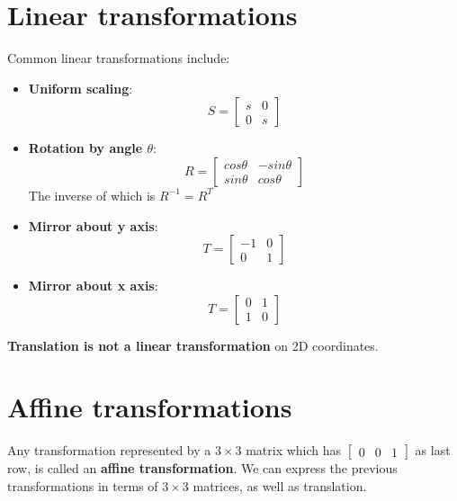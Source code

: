 \documentclass{article}
\begin{document}
\newpage

\section*{Linear transformations}

Common linear transformations include:
\begin{itemize}
    \item \textbf{Uniform scaling}:
    \begin{equation*}
        S = \begin{bmatrix}
            s & 0 \\ 
            0 & s
        \end{bmatrix}
    \end{equation*}
    \item \textbf{Rotation by angle $\theta$}:
    \begin{equation*}
        R = \begin{bmatrix}
            cos\theta & -sin\theta \\ 
            sin\theta & cos\theta
        \end{bmatrix}
    \end{equation*}
    The inverse of which is $R^{-1} = R^T$
    \item \textbf{Mirror about y axis}:
    \begin{equation*}
        T = \begin{bmatrix}
            -1 & 0 \\
            0 & 1
        \end{bmatrix}
    \end{equation*}
    \item \textbf{Mirror about x axis}:
    \begin{equation*}
        T = \begin{bmatrix}
            0 & 1 \\
            1 & 0
        \end{bmatrix}
    \end{equation*}
\end{itemize}

\textbf{Translation is not a linear transformation} on 2D coordinates.

\section*{Affine transformations}

Any transformation represented by a $3\times 3$ matrix which has $\begin{bmatrix}
    0 & 0 & 1
\end{bmatrix}$
as last row, is called an \textbf{affine transformation}. We can express the previous transformations in terms of $3\times 3$ matrices, as well as translation.\\ 
\end{document}
